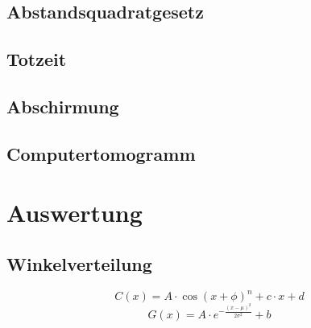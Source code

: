 \documentclass{article}
\begin{document}
\subsection{Abstandsquadratgesetz}


\subsection{Totzeit}


\subsection{Abschirmung}


\subsection{Computertomogramm}


\section{Auswertung}

\subsection{Winkelverteilung}

\begin{displaymath}
   C(x) = A \cdot \cos( x + \phi )^n + c \cdot x + d
\label{eq:CosinusAnpassung}
\end{displaymath}
\begin{displaymath}
    G(x) = A \cdot e^{-\frac{(x - \mu)^2}{2\sigma^2}} + b
\label{eq:GaussAnpassung}
\end{displaymath}
\end{document}
